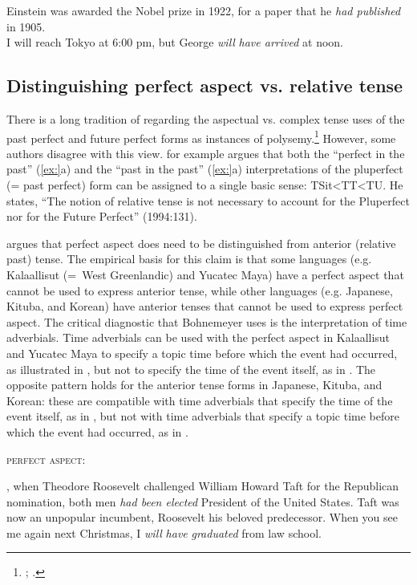 \ea
\ea Einstein was awarded the Nobel prize in 1922, for a paper that he \textit{had published}\\
  in 1905.\\
\ex I will reach Tokyo at 6:00 pm, but George \textit{will} \textit{have arrived} at noon.
                       \z
\z

\subsection{Distinguishing perfect aspect vs. relative tense}\label{sec:22.3.2}

There is a long tradition of regarding the aspectual vs. complex tense uses of the past perfect and future perfect forms as instances of polysemy.\footnote{\citet{Jespersen1924}; \citet{Comrie1976}.} However, some authors disagree with this view. \citet{Klein1994} for example argues that both the “perfect in the past” (\ref{ex:}a) and the “past in the past” (\ref{ex:}a) interpretations of the pluperfect (= past perfect) form can be assigned to a single basic sense: TSit<TT<TU. He states, “The notion of relative tense is not necessary to account for the Pluperfect nor for the Future Perfect” (1994:131).



\citet{Bohnemeyer2014} argues that perfect aspect does need to be distinguished from anterior (relative past) tense. The empirical basis for this claim is that some languages (e.g. Kalaallisut (=~West Greenlandic) and Yucatec Maya) have a perfect aspect that cannot be used to express anterior tense, while other languages (e.g. Japanese, Kituba, and Korean) have anterior tenses that cannot be used to express perfect aspect. The critical diagnostic that Bohnemeyer uses is the interpretation of time adverbials. Time adverbials can be used with the perfect aspect in Kalaallisut and Yucatec Maya to specify a topic time before which the event had occurred, as illustrated in , but not to specify the time of the event itself, as in . The opposite pattern holds for the anterior tense forms in Japanese, Kituba, and Korean: these are compatible with time adverbials that specify the time of the event itself, as in , but not with time adverbials that specify a topic time before which the event had occurred, as in .


\ea
\textsc{perfect aspect:}
\z

\ea
{}, when Theodore Roosevelt challenged William Howard Taft for the Republican nomination, both men \textit{had been elected} President of the United States. Taft was now an unpopular incumbent, Roosevelt his beloved predecessor.
\ex  When you see me again next Christmas, I \textit{will} \textit{have} \textit{graduated} from law school.
\z
\z 

